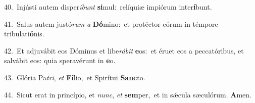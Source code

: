{\numbfont\textcolor{\numbcolor}{40.}}~Injústi autem disper\-\textit{í}\-\textit{bunt} \textbf{si}\-mul:~\star relíquiæ impiórum inter\-\textbf{í}\-bunt.\par
{\numbfont\textcolor{\numbcolor}{41.}}~Salus autem justó\textit{rum} \textit{a} \textbf{Dó}\-mino:~\star et protéctor eórum in témpore tribulati\-\textbf{ó}\-nis.\par
{\numbfont\textcolor{\numbcolor}{42.}}~Et adjuvábit eos Dóminus et libe\-\textit{rá}\-\textit{bit} \textbf{e}\-os:~\star et éruet eos a peccatóribus, et salvábit eos: quia speravérunt in \textbf{e}\-o.\par
{\numbfont\textcolor{\numbcolor}{43.}}~Glória Pa\-\textit{tri}\-, \textit{et} \textbf{Fí}\-lio,~\star et Spirítui \textbf{Sanc}\-to.\par
{\numbfont\textcolor{\numbcolor}{44.}}~Sicut erat in princípio, et \textit{nunc}\-, \textit{et} \textbf{sem}\-per,~\star et in sǽcula sæculórum. \textbf{A}\-men.\par
